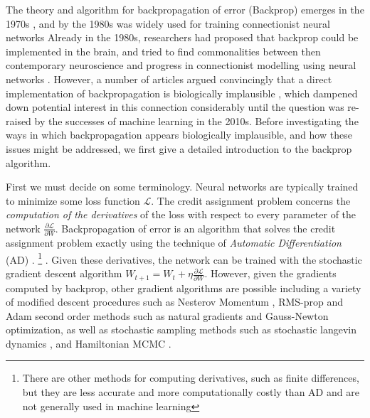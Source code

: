 The theory and algorithm for backpropagation of error (Backprop) emerges in the 1970s \citep{linnainmaa1970representation}, and by the 1980s was widely used for training connectionist neural networks \citep{rumelhart1985feature,rumelhart1986learning,griewank1989automatic} Already in the 1980s, researchers had proposed that backprop could be implemented in the brain, and tried to find commonalities between then contemporary neuroscience and progress in connectionist modelling using neural networks \citep{rumelhart1986learning}. However, a number of articles argued convincingly that a direct implementation of backpropagation is biologically implausible \citep{crick1989recent}, which dampened down potential interest in this connection considerably until the question was re-raised by the successes of machine learning in the 2010s. Before investigating the ways in which backpropagation appears biologically implausible, and how these issues might be addressed, we first give a detailed introduction to the backprop algorithm.

First we must decide on some terminology. Neural networks are typically trained to minimize some loss function $\mathcal{L}$. 
The credit assignment problem concerns the \emph{computation of the derivatives} of the loss with respect to every parameter of the network $\frac{\partial \mathcal{L}}{\partial W}$. Backpropagation of error is an algorithm that solves the credit assignment problem exactly using the technique of \emph{Automatic Differentiation} (AD) \citep{griewank1989automatic,baydin2017automatic,van2018automatic,paszke2017automatic}. \footnote{There are other methods for computing derivatives, such as finite differences, but they are less accurate and more computationally costly than AD and are not generally used in machine learning} . Given these derivatives, the network can be trained with the stochastic gradient descent algorithm $W_{t+1} = W_t + \eta \frac{\partial \mathcal{L}}{\partial W}$. However, given the gradients computed by backprop, other gradient algorithms are possible including a variety of modified descent procedures such as Nesterov Momentum \citep{nesterov27method}, RMS-prop \citep{hinton2012neural} and Adam \citep{kingma2014adam} second order methods such as natural gradients \citep{amari1995information} and Gauss-Newton optimization, as well as stochastic sampling methods such as stochastic langevin dynamics \citep{welling2011Bayesian}, and Hamiltonian MCMC \citep{neal2011MCMC}.


